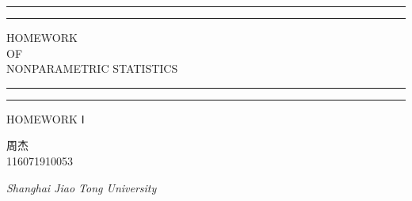 \documentclass[UTF8]{article}
\begin{document}
	\begin{titlepage} %
		
		\centering %
		
		\scshape %
		
		\vspace*{\baselineskip} %
		
		
		\rule{\textwidth}{1.6pt}\vspace*{-\baselineskip}\vspace*{2pt} %
		\rule{\textwidth}{0.4pt} %
		
		\vspace{0.75\baselineskip} %
		
		{\LARGE HOMEWORK\\ OF\\  NONPARAMETRIC STATISTICS\\} %
		
		\vspace{0.75\baselineskip} %
		
		\rule{\textwidth}{0.4pt}\vspace*{-\baselineskip}\vspace{3.2pt} %
		\rule{\textwidth}{1.6pt} %
		
		\vspace{2\baselineskip} %
		
		
		HOMEWORK Ⅰ %
		
		\vspace*{3\baselineskip} %
		
		
		
		\vspace{0.5\baselineskip} %
		
		{\scshape\Large 周杰 \\ 116071910053} %
		
		\vspace{0.5\baselineskip} %
		
		\textit{Shanghai Jiao Tong University} %
		
		\vfill %
		
		
	\end{titlepage}
\end{document}
